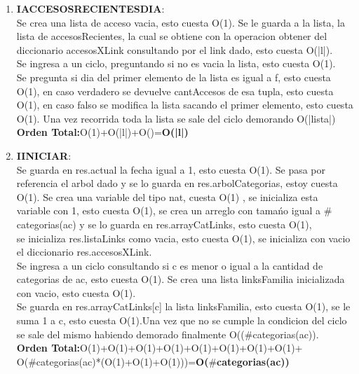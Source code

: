 \documentclass[10pt, a4paper]{article}
\begin{document}
\begin{enumerate}
     \item \textbf{IACCESOSRECIENTESDIA}:\\ Se crea una lista de acceso vacia, esto cuesta O(1). Se le guarda a la lista, la lista de accesosRecientes,
 la cual se obtiene con la operacion obtener del diccionario accesosXLink consultando por el link dado, esto cuesta O(|l|). \\
Se ingresa a un ciclo, preguntando si no es vacia la lista, esto cuesta O(1).\\
Se pregunta si dia del primer elemento de la lista es igual a f, esto cuesta O(1), en caso verdadero se devuelve cantAccesos de esa tupla, esto cuesta O(1), en caso falso se modifica la lista sacando el primer elemento, esto cuesta O(1). Una vez recorrida toda la lista se sale del ciclo demorando O(|lista|) \\
      \textbf{Orden Total:}O(1)+O(|l|)+O()=\textbf{O(|l|)}

      \item \textbf{IINICIAR}:\\ Se guarda en res.actual la fecha igual a 1, esto cuesta O(1). Se pasa por referencia el arbol dado y se lo guarda en res.arbolCategorias, estoy cuesta O(1).
Se crea una variable del tipo nat, cuesta O(1) , se inicializa esta variable con 1, esto cuesta O(1), se crea un arreglo con tama\'no  igual a $\#$categorias(ac) y se lo guarda en res.arrayCatLinks, esto cuesta O(1),\\
 se inicializa res.listaLinks como vacia, esto cuesta O(1), se inicializa con vacio el diccionario res.accesosXLink. \\
Se ingresa a un ciclo consultando si c es menor o igual a la cantidad de categorias de ac, esto cuesta O(1). Se crea una lista linksFamilia inicializada con vacio, esto cuesta O(1). \\
Se guarda en res.arrayCatLinks[c] la lista linksFamilia, esto cuesta O(1), se le suma 1 a c, esto cuesta O(1).Una vez que no se cumple la condicion del ciclo se sale del mismo habiendo demorado finalmente O(($\#$categorias(ac)). \\
	 \textbf{Orden Total:}O(1)+O(1)+O(1)+O(1)+O(1)+O(1)+O(1)+O(1)+\\O($\#$categorias(ac)*(O(1)+O(1)+O(1)))=\textbf{O($\#$categorias(ac))}


\end{enumerate}
\end{document}
